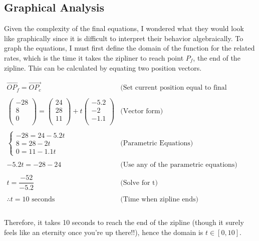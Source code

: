 \documentclass[12pt]{article}
\begin{document}
\subsection{Graphical Analysis}
Given the complexity of the final equations, I wondered what they would look like graphically since it is difficult to interpret their behavior algebraically. To graph the equations, I must first define the domain of the function for the related rates, which is the time it takes the zipliner to reach point $P_f$, the end of the zipline. This can be calculated by equating two position vectors.

$$
\begin{array}{l|c}
    \overrightarrow{OP_f} = \overrightarrow{OP_c} & \text{(Set current position equal to final position)}\\ \\
    \begin{pmatrix} -28 \\ 8 \\ 0 \\ \end{pmatrix} = \begin{pmatrix} 24 \\ 28 \\ 11 \\ \end{pmatrix} + t \begin{pmatrix} -5.2 \\ -2 \\ -1.1 \\ \end{pmatrix} & \text{(Vector form)}\\ \\
    \begin{cases}
      -28 = 24-5.2t \\
      8 = 28-2t \\
      0 = 11-1.1t 
    \end{cases} & \text{(Parametric Equations)} \\ \\
    -5.2t = -28 -24 & \text{(Use any of the parametric equations)} \\ \\
    t = \dfrac{-52}{-5.2} & \text{(Solve for t)}\\ \\
    \boxed{\therefore t = 10 \text{ seconds}} & \text{(Time when zipline ends)}\\
 \end{array} 
$$
\\
Therefore, it takes 10 seconds to reach the end of the zipline (though it surely feels like an eternity once you're up there!!), hence the domain is $t \in [0,10]$. 
\end{document}
